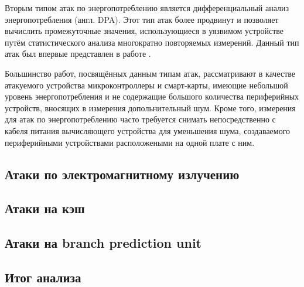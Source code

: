 Вторым типом атак по энергопотреблению является дифференциальный анализ
энергопотребления (англ. DPA). Этот тип атак более продвинут и позволяет
вычислить промежуточные значения, использующиеся в уязвимом устройстве путём
статистического анализа многократно повторяемых измерений. Данный тип атак был
впервые представлен в работе \cite{kocher-dpa}.

Большинство работ, посвящённых данным типам атак, рассматривают в качестве
атакуемого устройства микроконтроллеры и смарт-карты, имеющие небольшой уровень
энергопотребления и не содержащие большого количества периферийных устройств,
вносящих в измерения допольнительный шум. Кроме того, измерения для атак по
энергопотреблению часто требуется снимать непосредственно с кабеля питания
вычисляющего устройства для уменьшения шума, создаваемого периферийными
устройствами расположеными на одной плате с ним.

\subsection{Атаки по электромагнитному излучению}
\clearpage

\subsection{Атаки на кэш}
\clearpage

\subsection{Атаки на branch prediction unit}
\clearpage

\subsection{Итог анализа}
\clearpage
